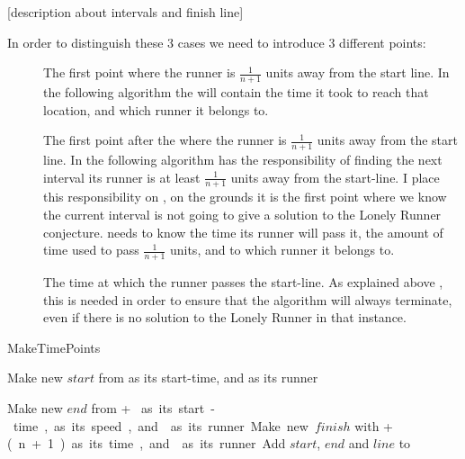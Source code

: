 [description about intervals and finish line]

In order to distinguish these 3 cases we need to introduce 3 different points:
\begin{description}
\item[\comStart] The first point where the runner is $\frac{1}{n + 1}$ units away from the start line. In the following algorithm the \comStart will contain the time it took to reach that location, and which runner it belongs to.
\item[\comEnd] The first point after the \comStart where the runner is $\frac{1}{n + 1}$ units away from the start line. In the following algorithm \comEnd has the responsibility of finding the next interval its runner is at least $\frac{1}{n+1}$ units away from the start-line. I place this responsibility on \comEnd, on the grounds it is the first point where we know the current interval is not going to give a solution to the Lonely Runner conjecture. \comEnd needs to know the time its runner will pass it, the amount of time used to pass $\frac{1}{n+1}$ units, and to which runner it belongs to.
\item[\comFin] The time at which the runner passes the start-line. As explained above , this is needed in order to ensure that the algorithm will always terminate, even if there is no solution to the Lonely Runner in that instance.
\end{description}

\begin{algorithm}[H]
\caption{MakeTimePoints}
\highlights
{}
 
Make new \startT $start$ from \start as its start-time, and \run as its runner 
  
Make new \eT $end$ from \start + \unit * \n as its start-time, \unit as its speed, and \run as its runner
  
Make new \finish $finish$ with \start + \unit * (n+1) as its time, and \run as its runner
  
Add $start$, $end$ and $line$ to \li

\return \li
\end{algorithm}

